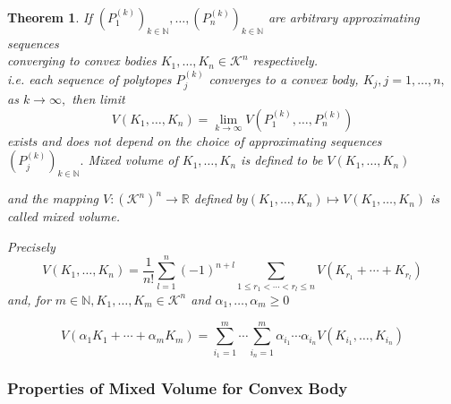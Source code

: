 \documentclass[oneside]{book}
\newtheorem{theorem}{Theorem}[section]
\theoremstyle{definition}
\begin{document}
 \begin{theorem}
 \label{t:10}
  If $\left(P_{1}^{(k)}\right)_{k \in \mathbb{N}}, \ldots,\left(P_{n}^{(k)}\right)_{k \in \mathbb{N}}$ are arbitrary approximating sequences\\
  
   converging to convex bodies  $K_{1}, \ldots, K_{n} \in \mathcal{K}^{n}$ respectively.
  \\
   i.e. each sequence of polytopes $P_{j}^{(k)}$ converges to a convex body, 
   $K_{j}, j=1, \ldots, n,$ as $k \rightarrow \infty,$ 
  then limit 
  \begin{equation}
  \label{eq51}
V\left(K_{1}, \ldots, K_{n}\right)=\lim _{k \rightarrow \infty} V\left(P_{1}^{(k)}, \ldots, P_{n}^{(k)}\right)
\end{equation}
exists and does not depend on the choice of approximating sequences $\left(P_{j}^{(k)}\right)_{k \in \mathbb{N}}. $ \newline
 Mixed volume of $K_{1}, \ldots, K_{n} $ is defined to be $V\left(K_{1}, \ldots, K_{n}\right)$ \newline
 
  and the mapping $V:\left(\mathcal{K}^{n}\right)^{n} \rightarrow \mathbb{R}$ defined $b y\left(K_{1}, \ldots, K_{n}\right) \mapsto V\left(K_{1}, \ldots, K_{n}\right)$ is called mixed volume.\newline
  
Precisely 
\begin{equation} 
\label{eq52}
V\left(K_{1}, \ldots, K_{n}\right)=\frac{1}{n !} \sum_{l=1}^{n}(-1)^{n+l} \sum_{1 \leq r_{1}<\cdots<r_{l} \leq n} V\left(K_{r_{1}}+\cdots+K_{r_{l}}\right)
\end{equation}
and, for $m \in \mathbb{N}, K_{1}, \ldots, K_{m} \in \mathcal{K}^{n}$ and $\alpha_{1}, \ldots, \alpha_{m} \geq 0$
 
 
\begin{equation}
\label{eq53}
V\left(\alpha_{1} K_{1}+\cdots+\alpha_{m} K_{m}\right)=\sum_{i_{1}=1}^{m} \cdots \sum_{i_{n}=1}^{m} \alpha_{i_{1}} \cdots \alpha_{i_{n}} V\left(K_{i_{1}}, \ldots, K_{i_{n}}\right)
\end{equation}
 \end{theorem}
 
 \subsubsection{Properties of Mixed Volume for Convex Body}
 
\end{document}
